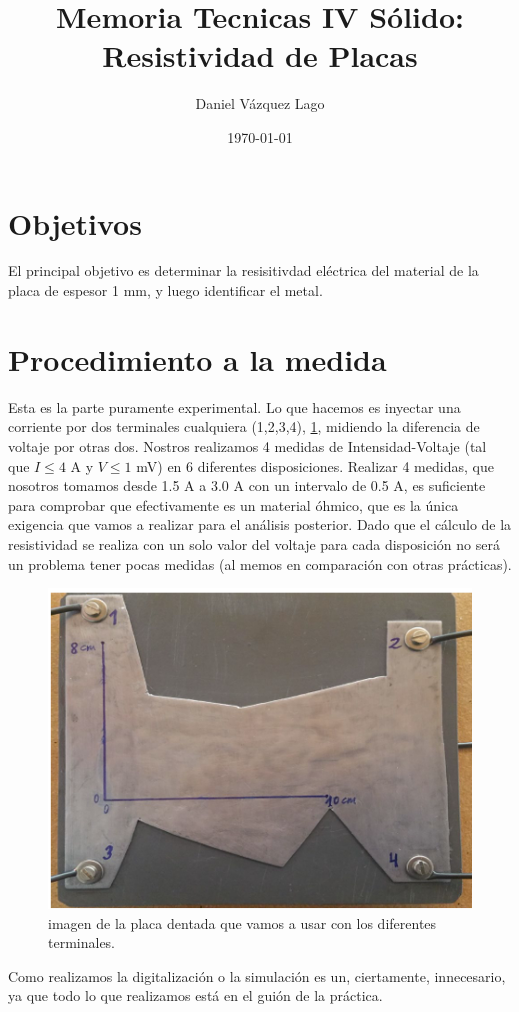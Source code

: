 \documentclass[11pt]{article}
\title{Memoria Tecnicas IV Sólido: Resistividad de Placas}
\author{Daniel Vázquez Lago}
\date{\today}
\begin{document}
\maketitle

\tableofcontents

\setlength{\parskip}{1.8mm}                         %

\newpage

\section{Objetivos}

El principal objetivo es determinar la resisitivdad eléctrica del material de la placa de espesor 1 mm, y luego identificar el metal. 

\section{Procedimiento a la medida}

Esta es la parte puramente experimental. Lo que hacemos es inyectar una corriente por dos terminales cualquiera (1,2,3,4), \cref{Fig:01}, midiendo la diferencia de voltaje por otras dos. Nostros realizamos 4 medidas de Intensidad-Voltaje (tal que $I\leq 4$ A y $V\leq 1$ mV) en 6 diferentes disposiciones. Realizar 4 medidas, que nosotros tomamos desde 1.5 A a 3.0 A con un intervalo de 0.5 A, es suficiente para comprobar que efectivamente es un material óhmico, que es la única exigencia que vamos a realizar para el análisis posterior. Dado que el cálculo de la resistividad se realiza con un solo valor del voltaje para cada disposición no será un problema tener pocas medidas (al memos en comparación con otras prácticas). 

\begin{figure}[h!] \centering
	\includegraphics{Agros/placa prueba.png}
	\caption{imagen de la placa dentada que vamos a usar con los diferentes terminales.}
	\label{Fig:01}
\end{figure}
Como realizamos la digitalización o la simulación es un, ciertamente, innecesario, ya que todo lo que realizamos está en el guión de la práctica. 
\end{document}
